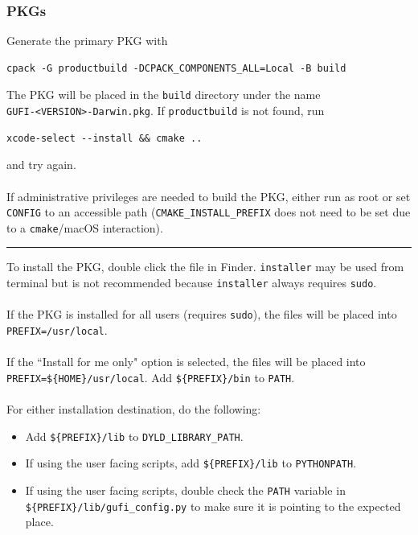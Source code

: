 \subsubsection{PKGs}
\label{sec:pkgs}
Generate the primary PKG with
\begin{verbatim}
cpack -G productbuild -DCPACK_COMPONENTS_ALL=Local -B build
\end{verbatim}
The PKG will be placed in the \texttt{build} directory under the name
\\\texttt{GUFI-<VERSION>-Darwin.pkg}. If \texttt{productbuild} is not
found, run
\begin{verbatim}
xcode-select --install && cmake ..
\end{verbatim}
and try again.
\\\\
If administrative privileges are needed to build the PKG, either run
as root or set \texttt{CONFIG} to an accessible path
(\texttt{CMAKE\_INSTALL\_PREFIX} does not need to be set due to a
\texttt{cmake}/macOS interaction).
\bigskip
\hrule
\bigskip
\noindent To install the PKG, double click the file in
Finder. \texttt{installer} may be used from terminal but is not
recommended because \texttt{installer} always requires \texttt{sudo}.
\\\\
If the PKG is installed for all users (requires \texttt{sudo}), the
files will be placed into \texttt{PREFIX=/usr/local}.
\\\\
If the ``Install for me only" option is selected, the files will be
placed into \texttt{PREFIX=\$\{HOME\}/usr/local}. Add
\texttt{\$\{PREFIX\}/bin} to \texttt{PATH}.
\\\\
For either installation destination, do the following:
\begin{itemize}
  \item Add \texttt{\$\{PREFIX\}/lib} to
    \texttt{DYLD\_LIBRARY\_PATH}.
  \item If using the user facing scripts, add
    \texttt{\$\{PREFIX\}/lib} to \texttt{PYTHONPATH}.
  \item If using the user facing scripts, double check the
    \texttt{PATH} variable in \\
    \texttt{\$\{PREFIX\}/lib/gufi\_config.py} to make sure it is
    pointing to the expected place.
\end{itemize}

